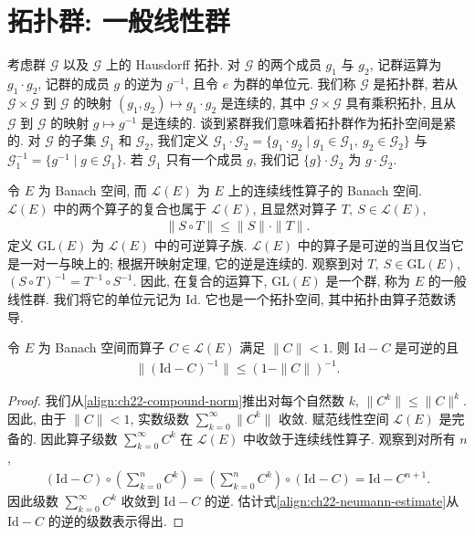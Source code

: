 \documentclass[../../main.tex]{subfiles}
\begin{document}
\section{拓扑群: 一般线性群}\label{section:ch22-拓扑群}

考虑群 $\mathcal{G}$ 以及 $\mathcal{G}$ 上的 Hausdorff 拓扑. 对 $\mathcal{G}$ 的两个成员 $g_{1}$ 与 $g_{2}$, 记群运算为 $g_{1}\cdot g_{2}$, 记群的成员 $g$ 的逆为 $g^{-1}$, 且令 $e$ 为群的单位元. 我们称 $\mathcal{G}$ 是拓扑群, 若从 $\mathcal{G}\times\mathcal{G}$ 到 $\mathcal{G}$ 的映射 $(g_{1},g_{2})\mapsto g_{1}\cdot g_{2}$ 是连续的, 其中 $\mathcal{G}\times\mathcal{G}$ 具有乘积拓扑, 且从 $\mathcal{G}$ 到 $\mathcal{G}$ 的映射 $g\mapsto g^{-1}$ 是连续的. 谈到紧群我们意味着拓扑群作为拓扑空间是紧的. 对 $\mathcal{G}$ 的子集 $\mathcal{G}_{1}$ 和 $\mathcal{G}_{2}$, 我们定义 $\mathcal{G}_{1}\cdot\mathcal{G}_{2}=\{g_{1}\cdot g_{2}\mid g_{1}\in\mathcal{G}_{1},\ g_{2}\in\mathcal{G}_{2}\}$ 与 $\mathcal{G}_{1}^{-1}=\{g^{-1}\mid g\in\mathcal{G}_{1}\}$. 若 $\mathcal{G}_{1}$ 只有一个成员 $g$, 我们记 $\{g\}\cdot\mathcal{G}_{2}$ 为 $g\cdot\mathcal{G}_{2}$.

令 $E$ 为 Banach 空间, 而 $\mathcal{L}(E)$ 为 $E$ 上的连续线性算子的 Banach 空间. $\mathcal{L}(E)$ 中的两个算子的复合也属于 $\mathcal{L}(E)$, 且显然对算子 $T,\ S\in\mathcal{L}(E)$,
\begin{align}
\|S\circ T\|\leqslant\|S\|\cdot\|T\|.
\label{align:ch22-compound-norm}
\end{align}
定义 $\mathrm{GL}(E)$ 为 $\mathcal{L}(E)$ 中的可逆算子族. $\mathcal{L}(E)$ 中的算子是可逆的当且仅当它是一对一与映上的; 根据开映射定理, 它的逆是连续的. 观察到对 $T,\ S\in\mathrm{GL}(E)$, $(S\circ T)^{-1}=T^{-1}\circ S^{-1}$. 因此, 在复合的运算下, $\mathrm{GL}(E)$ 是一个群, 称为 $E$ 的一般线性群. 我们将它的单位元记为 $\mathrm{Id}$. 它也是一个拓扑空间, 其中拓扑由算子范数诱导.

\begin{lemma}[Neumann 级数]\label{lemma:ch22-neumann-series}
令 $E$ 为 Banach 空间而算子 $C\in\mathcal{L}(E)$ 满足 $\|C\|<1$. 则 $\mathrm{Id}-C$ 是可逆的且
\begin{align}
\|(\mathrm{Id}-C)^{-1}\|\leqslant(1-\|C\|)^{-1}.
\label{align:ch22-neumann-estimate}
\end{align}
\end{lemma}

\begin{proof}
我们从\eqref{align:ch22-compound-norm}推出对每个自然数 $k$, $\|C^{k}\|\leqslant\|C\|^{k}$. 因此, 由于 $\|C\|<1$, 实数级数 $\sum_{k=0}^{\infty}\|C^{k}\|$ 收敛. 赋范线性空间 $\mathcal{L}(E)$ 是完备的. 因此算子级数 $\sum_{k=0}^{\infty}C^{k}$ 在 $\mathcal{L}(E)$ 中收敛于连续线性算子. 观察到对所有 $n$,
\begin{align*}
(\mathrm{Id}-C)\circ\left(\sum_{k=0}^{n}C^{k}\right)=\left(\sum_{k=0}^{n}C^{k}\right)\circ(\mathrm{Id}-C)=\mathrm{Id}-C^{n+1}.
\end{align*}
因此级数 $\sum_{k=0}^{\infty}C^{k}$ 收敛到 $\mathrm{Id}-C$ 的逆. 估计式\eqref{align:ch22-neumann-estimate}从 $\mathrm{Id}-C$ 的逆的级数表示得出.
\end{proof}
\end{document}
